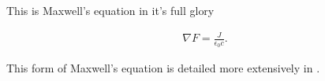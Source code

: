 \documentclass{article}
\newcommand{\grad}[0]{\nabla}
\begin{document}
This is Maxwell's equation in it's full glory

\begin{align}
\grad F = \frac{J}{\epsilon_0 c}.
\end{align}

This form of Maxwell's equation is detailed more extensively in
\cite{doran2003gap}.

\end{document}
